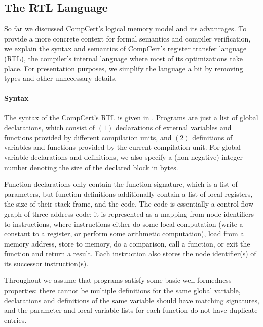 \subsection{The RTL Language}
\label{sec:background:rtl}

So far we discussed CompCert's logical memory model and its advanrages.  To provide a more concrete
context for formal semantics and compiler verification, we explain the syntax and semantics of
CompCert's register transfer language (RTL), the compiler's internal language where most of its
optimizations take place.  For presentation purposes, we simplify the language a bit by removing
types and other unnecessary details.



\paragraph{Syntax}



The syntax of the CompCert's RTL is given in .  Programs are just a list
of global declarations, which consist of $(1)$ declarations of external variables and functions
provided by different compilation units, and $(2)$ definitions of variables and functions provided
by the current compilation unit.  For global variable declarations and definitions, we also specify
a (non-negative) integer number denoting the size of the declared block in bytes.

Function declarations only contain the function signature, which is a list of parameters, but
function definitions additionally contain a list of local registers, the size of their stack frame,
and the code.  The code is essentially a control-flow graph of three-address code: it is represented
as a mapping from node identifiers to instructions, where instructions either
%
do some local computation (\eg write a constant to a register, or perform some arithmetic
computation),
%
load from a memory address, 
%
store to memory,
%
do a comparison,
%
call a function, 
%
or exit the function and return a result. 
%
Each instruction also stores the node identifier(s) of its successor instruction(s).

Throughout we assume that programs satisfy some basic well-formedness properties: there cannot be
multiple definitions for the same global variable, declarations and definitions of the same variable
should have matching signatures, and the parameter and local variable lists for each function do not
have duplicate entries.


